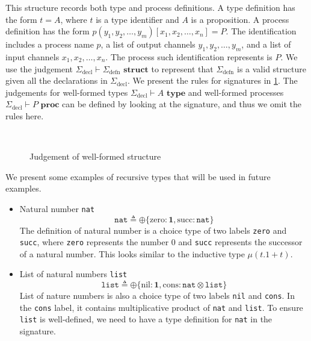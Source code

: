 \documentclass[12pt, openany]{memoir}
\begin{document}
This structure records both type and process definitions. A type definition has the form $t = A$, 
where $t$ is a type identifier and $A$ is a proposition. A process definition has the form $p (y_1, y_2, \ldots, y_m) [x_1, x_2, \ldots, x_n] = P$. 
The identification includes a process name $p$, a list of output channels $y_1, y_2, \ldots, y_m$, 
and a list of input channels $x_1, x_2, \ldots, x_n$. The process such identification represents is $P$. 
We use the judgement $\Sigma_{\text{decl}} \vdash \Sigma_{\text{defn}} \textbf{ struct}$ to represent that $\Sigma_{\text{defn}}$ 
is a valid structure given all the declarations in $\Sigma_{\text{decl}}$. We present the rules for signatures in \cref{fig:sig}. 
The judgements for well-formed types $\Sigma_{\text{decl}} \vdash A \textbf{ type}$ 
and well-formed processes $\Sigma_{\text{decl}} \vdash P \textbf{ proc}$ can be defined by looking at the signature, 
and thus we omit the rules here.
\begin{figure}[H]
  \centering
  \begin{rules}
    \qquad
    \\
  \end{rules}
  \caption{Judgement of well-formed structure}
  \label{fig:sig}
\end{figure}
We present some examples of recursive types that will be used in future examples.
\begin{itemize}
  \item Natural number \texttt{nat}
  \[
    \texttt{nat} \triangleq \oplus\{\text{zero} : \textbf{1}, \text{succ} : \texttt{nat}\}
  \]
  The definition of natural number is a choice type of two labels \texttt{zero} and \texttt{succ},
  where \texttt{zero} represents the number $0$ and \texttt{succ} represents the successor of a natural number.
  This looks similar to the inductive type $\mu(t.1 + t)$.
  \item List of natural numbers \texttt{list}
  \[
    \texttt{list} \triangleq \oplus\{\text{nil} : \textbf{1}, \text{cons} : \texttt{nat} \otimes \texttt{list}\}
  \]
  List of nature numbers is also a choice type of two labels \texttt{nil} and \texttt{cons}.
  In the \texttt{cons} label, it contains multiplicative product of \texttt{nat} and \texttt{list}.
  To ensure \texttt{list} is well-defined, we need to have a type definition for \texttt{nat} in the signature. 
\end{itemize}
\end{document}
